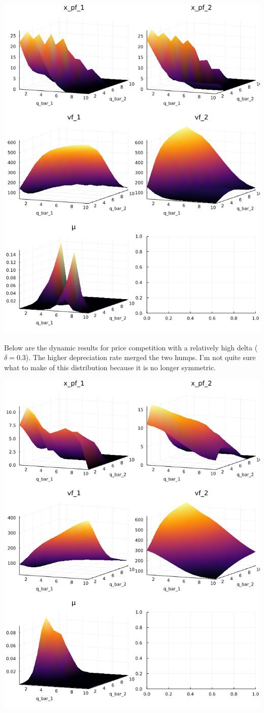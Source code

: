 \documentclass{article}
\begin{document}
\includegraphics[scale=.65]{p_low_delta_dynamic.png}

\pagebreak

Below are the dynamic results for price competition with a relatively high delta ($\delta = 0.3$). The higher depreciation rate merged the two humps.  I'm not quite sure what to make of this distribution because it is no longer symmetric.

\includegraphics[scale=.65]{p_high_delta_dynamic.png}
\end{document}
